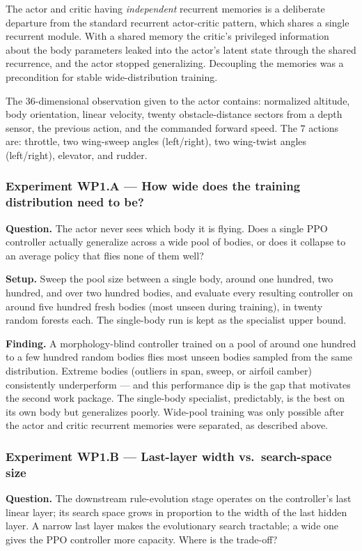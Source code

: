 \documentclass[letterpaper,10pt]{article}
\begin{document}
The actor and critic having \emph{independent} recurrent memories is a deliberate departure from the standard recurrent actor-critic pattern, which shares a single recurrent module. With a shared memory the critic's privileged information about the body parameters leaked into the actor's latent state through the shared recurrence, and the actor stopped generalizing. Decoupling the memories was a precondition for stable wide-distribution training.

The $36$-dimensional observation given to the actor contains: normalized altitude, body orientation, linear velocity, twenty obstacle-distance sectors from a depth sensor, the previous action, and the commanded forward speed. The $7$ actions are: throttle, two wing-sweep angles (left/right), two wing-twist angles (left/right), elevator, and rudder.

\subsubsection{Experiment WP1.A — How wide does the training distribution need to be?}
\textbf{Question.} The actor never sees which body it is flying. Does a single PPO controller actually generalize across a wide pool of bodies, or does it collapse to an average policy that flies none of them well?

\textbf{Setup.} Sweep the pool size between a single body, around one hundred, two hundred, and over two hundred bodies, and evaluate every resulting controller on around five hundred fresh bodies (most unseen during training), in twenty random forests each. The single-body run is kept as the specialist upper bound.

\textbf{Finding.} A morphology-blind controller trained on a pool of around one hundred to a few hundred random bodies flies most unseen bodies sampled from the same distribution. Extreme bodies (outliers in span, sweep, or airfoil camber) consistently underperform --- and this performance dip is the gap that motivates the second work package. The single-body specialist, predictably, is the best on its own body but generalizes poorly. Wide-pool training was only possible after the actor and critic recurrent memories were separated, as described above.

\subsubsection{Experiment WP1.B — Last-layer width vs.\ search-space size}
\textbf{Question.} The downstream rule-evolution stage operates on the controller's last linear layer; its search space grows in proportion to the width of the last hidden layer. A narrow last layer makes the evolutionary search tractable; a wide one gives the PPO controller more capacity. Where is the trade-off?
\end{document}
